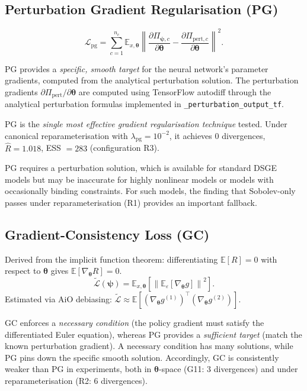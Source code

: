 \documentclass[11pt,a4paper]{article}
\theoremstyle{definition}
\newcommand{\E}{\mathbb{E}}
\newcommand{\btheta}{\boldsymbol{\theta}}
\newcommand{\bpsi}{\boldsymbol{\psi}}
\newcommand{\code}[1]{\texttt{\color{codecolor}#1}}
\begin{document}
	\subsection{Perturbation Gradient Regularisation (PG)}
	\label{sec:pg}
	
	\begin{equation}\label{eq:pg_loss}
		\mathcal{L}_{\mathrm{pg}} = \sum_{c=1}^{n_c} \E_{x,\btheta}\!\left\|\frac{\partial \Pi_{{\bpsi},c}}{\partial \btheta} - \frac{\partial \Pi_{\mathrm{pert},c}}{\partial \btheta}\right\|^2.
	\end{equation}
	
	PG provides a \emph{specific, smooth target} for the neural network's parameter gradients, computed from the analytical perturbation solution.
	The perturbation gradients $\partial\Pi_{\mathrm{pert}}/\partial\btheta$ are computed using TensorFlow autodiff through the analytical perturbation formulas implemented in \code{\_perturbation\_output\_tf}.
	
	PG is the \emph{single most effective gradient regularisation technique} tested.
	Under canonical reparameterisation with $\lambda_{\mathrm{pg}} = 10^{-2}$, it achieves 0 divergences, $\hat{R} = 1.018$, ESS $= 283$ (configuration R3).
	
	PG requires a perturbation solution, which is available for standard DSGE models but may be inaccurate for highly nonlinear models or models with occasionally binding constraints.
	For such models, the finding that Sobolev-only passes under reparameterisation (R1) provides an important fallback.
	
	\subsection{Gradient-Consistency Loss (GC)}
	\label{sec:gc}
	
	Derived from the implicit function theorem: differentiating $\E[R] = 0$ with respect to $\btheta$ gives $\E[\nabla_{\btheta}R] = 0$.
	\begin{equation}\label{eq:gc_loss}
		\widetilde{\mathcal{L}}(\bpsi) = \E_{x,\btheta}\!\left[\left\|\E_\varepsilon\!\left[\nabla_{\btheta} g\right]\right\|^2\right].
	\end{equation}
	Estimated via AiO debiasing: $\widetilde{\mathcal{L}} \approx \E[(\nabla_{\btheta} g^{(1)})^\top (\nabla_{\btheta} g^{(2)})]$.
	
	GC enforces a \emph{necessary condition} (the policy gradient must satisfy the differentiated Euler equation), whereas PG provides a \emph{sufficient target} (match the known perturbation gradient).
	A necessary condition has many solutions, while PG pins down the specific smooth solution.
	Accordingly, GC is consistently weaker than PG in experiments, both in $\btheta$-space (G11: 3 divergences) and under reparameterisation (R2: 6 divergences).
	
\end{document}
